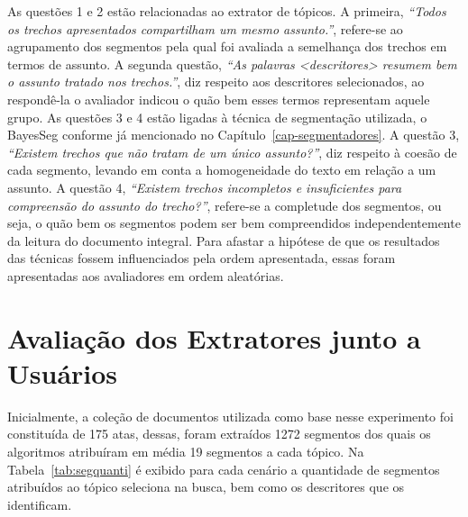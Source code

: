 As questões 1 e 2 estão relacionadas ao extrator de tópicos. 
A primeira, \textit{``Todos os trechos apresentados compartilham um mesmo assunto.''}, refere-se ao agrupamento dos segmentos pela qual foi avaliada a semelhança dos trechos em termos de assunto. 
A segunda questão, \textit{``As palavras \textit{<descritores>} resumem bem o assunto tratado nos trechos.''}, diz respeito aos descritores selecionados, ao respondê-la o avaliador indicou o quão bem esses termos representam aquele grupo.
As questões 3 e 4 estão ligadas à técnica de segmentação utilizada, o BayesSeg conforme já mencionado no Capítulo~\ref{cap-segmentadores}. 
A questão 3, \textit{``Existem trechos que não tratam de um único assunto?''}, diz respeito à coesão de cada segmento, levando em conta a homogeneidade do texto em relação a um assunto. A questão 4, \textit{``Existem trechos incompletos e insuficientes para compreensão do assunto do trecho?''}, refere-se a completude dos segmentos, ou seja, o quão bem os segmentos podem ser bem compreendidos independentemente da leitura do documento integral.
Para afastar a hipótese de que os resultados das técnicas fossem influenciados pela ordem apresentada, essas foram apresentadas aos avaliadores em ordem aleatórias.





\section{Avaliação dos Extratores junto a Usuários}

Inicialmente, a coleção de documentos utilizada como base nesse experimento foi constituída de 175 atas, dessas, foram extraídos 1272 segmentos dos quais os algoritmos atribuíram em média 19 segmentos a cada tópico. Na Tabela~\ref{tab:segquanti} é exibido para cada cenário a quantidade de segmentos atribuídos ao tópico seleciona na busca, bem como os descritores que os identificam.
 
